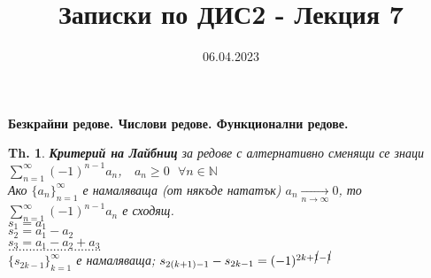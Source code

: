 \documentclass[12pt]{article}
\newtheorem{theorem}{Th.}
\newcommand{\spc}{\text{ }}
\begin{document}
	\color{white}
	\pagecolor{darkgray}
	\title{Записки по ДИС2 - Лекция 7}
	\date{06.04.2023}
	\maketitle
	\begin{center}
		\Large
		\textbf{Безкрайни редове. Числови редове. Функционални редове.}
	\end{center}
	
	\begin{theorem}
		\textit{\textbf{Критерий на Лайбниц} за редове с алтернативно сменящи се знаци} \\
		$\sum_{n=1}^{\infty} (-1)^{n-1}a_n$, $\spc a_n \geq 0 \spc\forall n \in \mathbb{N}$ \\
		
		Ако $\{a_n\}_{n=1}^\infty$ е намаляваща (от някъде нататък) $a_n \xrightarrow[n \to \infty]{} 0$, то $\sum_{n=1}^{\infty}(-1)^{n-1} a_n$ е сходящ. \\
		$s_1 = a_1$ \\
		$s_2 = a_1 - a_2$ \\
		$s_3 = a_1 - a_2 + a_3$ \\
		$...........................$ \\
		
		$\{s_{2k-1}\}_{k=1}^{\infty}$ е намаляваща; $s_{2(k+1)-1} - s_{2k-1} = (-1)^{2k+\cancel{1}-\cancel{1}}$
		
	\end{theorem}
	
\end{document}
